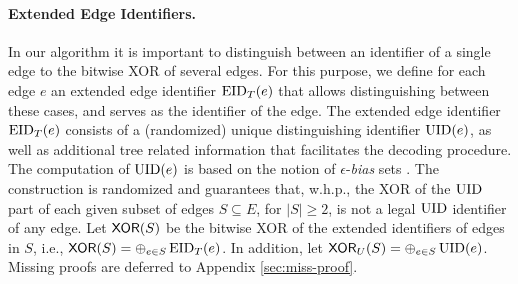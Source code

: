 \paragraph{Extended Edge Identifiers.} In our algorithm it is important to distinguish between an identifier of a single edge to the bitwise XOR of several edges. For this purpose, we define for each edge $e$ an extended edge identifier $\operatorname{EID}_T(e)$ that allows distinguishing between these cases, and serves as the identifier of the edge.
The extended edge identifier $\operatorname{EID}_T(e)$ consists of a (randomized) unique distinguishing identifier $\operatorname{UID}(e)$, as well as additional tree related information that facilitates the decoding procedure. The computation of $\operatorname{UID}(e)$ is based on the notion of $\epsilon$-\emph{bias} sets \cite{naor1993small}. The construction is randomized and guarantees that, w.h.p., the XOR of the $\operatorname{UID}$ part of each given subset of edges $S \subseteq E$, for $|S|\geq 2$, is not a legal $\operatorname{UID}$ identifier of any edge.
Let $\mathsf{XOR}(S)$ be the bitwise XOR of the extended identifiers of edges in $S$, i.e., $\mathsf{XOR}(S)=\oplus_{e \in S} \operatorname{EID}_T(e)$. In addition, let $\mathsf{XOR}_U(S)=\oplus_{e \in S} \operatorname{UID}(e)$. Missing proofs are deferred to Appendix \ref{sec:miss-proof}.

